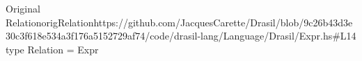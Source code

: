\begin{haskell}{Original Relation}{origRelation}{https://github.com/JacquesCarette/Drasil/blob/9c26b43d3e30c3f618e534a3f176a5152729af74/code/drasil-lang/Language/Drasil/Expr.hs\#L14}
type Relation = Expr
\end{haskell}
